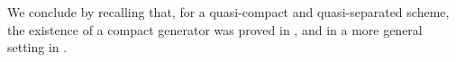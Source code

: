 \documentclass[oneside, hidelinks, 12pt, a4paper,reqno]{amsart}
\theoremstyle{plain}
\theoremstyle{definition}
\newtheorem{construction}[construction]{Construction}
\theoremstyle{plain}
\newcommand{\rL}{\mathrm L}
\newcommand{\Sch}{\mathrm{Sch}}
\newcommand{\Perf}{\mathrm{Perf}}
\newcommand{\cat}{$\infty$-category }
\newcommand{\catperf}{\mathrm{Cat}^{\Perf}}
\newcommand{\LPr}{\mathrm{Pr}^\rL}
\newcommand{\Qcoh}{\mathrm{QCoh}}
\begin{document}
We conclude by recalling that, for a quasi-compact and quasi-separated scheme, the existence of a compact generator was proved in \cite{bondal2002generatorsrepresentabilityfunctorscommutative}, and in a more general setting in \cite{toen2011derivedazumayaalgebrasgenerators}.

\end{document}

